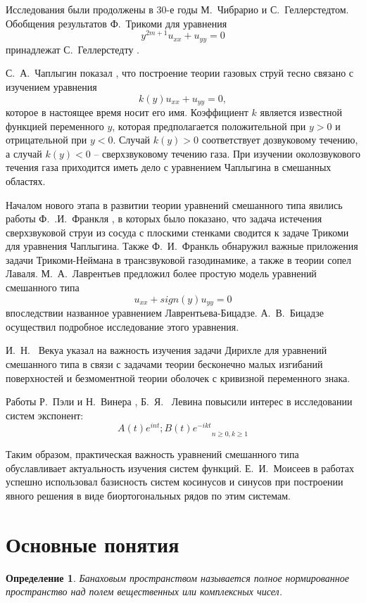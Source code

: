 ﻿\documentclass[oneside, final, 14pt]{extreport}
\newtheorem{definition}{Определение}
\begin{document}
Исследования были продолжены в 30-е годы М.~Чибрарио и С.~Геллерстедтом. 
Обобщения результатов Ф.~Трикоми для уравнения
$$y^{2m+1}u_{xx} + u_{yy} = 0$$
принадлежат С.~Геллерстедту \cite{gellerstedt}.

С.~А.~Чаплыгин показал \cite{chaplygin}, что построение теории газовых струй тесно
связано с изучением уравнения
$$k(y)u_{xx} + u_{yy} = 0,$$
которое в настоящее время носит его имя. Коэффициент $k$ является
известной функцией переменного $y$, которая предполагается положительной
при $y > 0$ и отрицательной при $y < 0$. Случай $k(y) > 0$ соответствует
дозвуковому течению, а случай $k(y) < 0$ – сверхзвуковому течению газа.
При изучении околозвукового течения газа приходится иметь дело с
уравнением Чаплыгина в смешанных областях.

Началом нового этапа в развитии теории уравнений смешанного типа
явились работы Ф.~.И.~Франкля \cite{frankl-laval, frankl-eq}, в которых было показано, что задача
истечения сверхзвуковой струи из сосуда с плоскими стенками сводится к
задаче Трикоми для уравнения Чаплыгина. Также Ф.~И.~Франкль обнаружил важные приложения задачи Трикоми-Неймана в трансзвуковой
газодинамике, а также в теории сопел Лаваля. М.~А.~Лаврентьев предложил \cite{lavrentiev-bitsadze} более
простую модель уравнений смешанного типа
$$u_{xx} + sign(y) u_{yy} = 0$$
впоследствии названное уравнением Лаврентьева-Бицадзе. А.~В.~Бицадзе
осуществил подробное исследование этого уравнения.

И.~Н.~ Векуа указал \cite{vekua} на важность изучения задачи Дирихле для уравнений
смешанного типа в связи с задачами теории бесконечно малых изгибаний
поверхностей и безмоментной теории оболочек с кривизной переменного
знака. 

Работы Р.~Пэли и Н.~Винера \cite{paley-wiener}, Б.~Я.~ Левина \cite{levin} повысили интерес в исследовании 
систем экспонент:
$${A(t)e^{int}; B(t)e^{-ikt}}_{n \geqslant 0, k \geqslant 1}$$

Таким образом, практическая важность уравнений смешанного типа обуславливает 
актуальность изучения систем функций. Е.~И.~Моисеев в работах \cite{moiseev-1990, moiseev-1996} успешно
использовал базисность систем косинусов и синусов при построении явного решения в виде
биортогональных рядов по этим системам. 

\section{Основные понятия}

\begin{definition}
	\textit{Банаховым} пространством называется полное нормированное пространство	
	над полем вещественных или комплексных чисел.
\end{definition}
\end{document}
